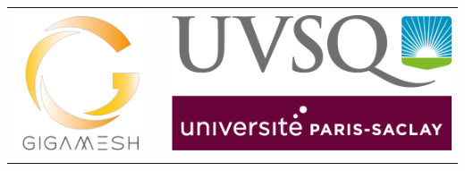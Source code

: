 \documentclass[
11pt, %
french, %
singlespacing, %
headsepline, %
]{MastersDoctoralThesis} %
\author{Mr. Mickael \textsc{BENHASSEN}} %
\begin{document}
\frontmatter %

\pagestyle{plain} %


\begin{titlepage}
\begin{center}


  \begin{center}
  \setlength{\tabcolsep}{0pt}
  \begin{tabular}{>{\raggedleft}m{2.5cm}>{\centering}m{\dimexpr\textwidth - 5cm\relax}>{\raggedright}m{2.5cm}}
  \includegraphics[width=\linewidth]{Figures/giga}%
  &%
  &%
  \includegraphics[width=\linewidth]{Figures/logouvsq} %
  \end{tabular}
  \end{center}


\end{center}
\end{titlepage}
\end{document}

